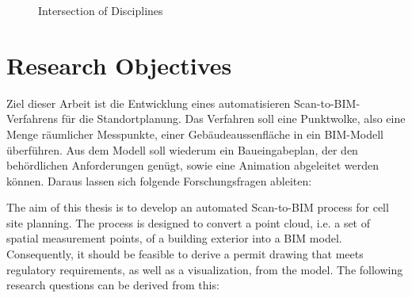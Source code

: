 \begin{figure}[h!]
    \centering
    \caption{Intersection of Disciplines}
    \label{fig:intersection}
\end{figure}
    
\section{Research Objectives}
\label{sec:research_objectives}
\begin{German}
    Ziel dieser Arbeit ist die Entwicklung eines automatisieren Scan-to-BIM-Verfahrens für die Standortplanung. Das Verfahren soll eine Punktwolke, also eine Menge räumlicher Messpunkte, einer Gebäudeaussenfläche in ein BIM-Modell überführen. Aus dem Modell soll wiederum ein Baueingabeplan, der den behördlichen Anforderungen genügt, sowie eine Animation abgeleitet werden können. Daraus lassen sich folgende Forschungsfragen ableiten:
\end{German}
\begin{English}
    The aim of this thesis is to develop an automated Scan-to-BIM process for cell site planning. The process is designed to convert a point cloud, i.e. a set of spatial measurement points, of a building exterior into a BIM model. Consequently, it should be feasible to derive a permit drawing that meets regulatory requirements, as well as a visualization, from the model. The following research questions can be derived from this:
\end{English}

